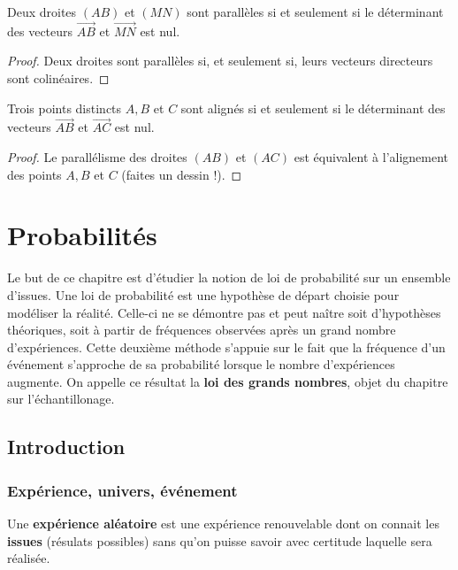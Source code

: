 \documentclass[a4paper, 12pt]{report}
\begin{document}
\begin{coro}
Deux droites $(AB)$ et $(MN)$ sont parallèles si et seulement si le déterminant des vecteurs $\vec{AB}$ et $\vec{MN}$ est nul.
\end{coro}

\begin{proof}
Deux droites sont parallèles si, et seulement si, leurs vecteurs directeurs sont colinéaires.
\end{proof}

\begin{coro}
Trois points distincts $A, B$ et $C$ sont alignés si et seulement si le déterminant des vecteurs $\vec{AB}$ et $\vec{AC}$ est nul.
\end{coro}

\begin{proof}
Le parallélisme des droites $(AB)$ et $(AC)$ est équivalent à l'alignement des points $A, B$ et $C$ (faites un dessin !).
\end{proof}

\chapter{Probabilités}

Le but de ce chapitre est d'étudier la notion de loi de probabilité sur un ensemble d'issues.
Une loi de probabilité est une hypothèse de départ choisie pour modéliser la réalité.
Celle-ci ne se démontre pas et peut naître soit d'hypothèses théoriques, soit à partir de fréquences observées après un grand nombre d'expériences.
Cette deuxième méthode s'appuie sur le fait que la fréquence d'un événement s'approche de sa probabilité lorsque le nombre d'expériences augmente.
On appelle ce résultat la \textbf{loi des grands nombres}, objet du chapitre sur l'échantillonage.

\section{Introduction}

\subsection{Expérience, univers, événement}

\begin{defn}
	Une \textbf{expérience aléatoire} est une expérience renouvelable dont on connait les \textbf{issues} (résulats possibles) sans qu'on puisse savoir avec certitude laquelle sera réalisée.
\end{defn}
\end{document}
